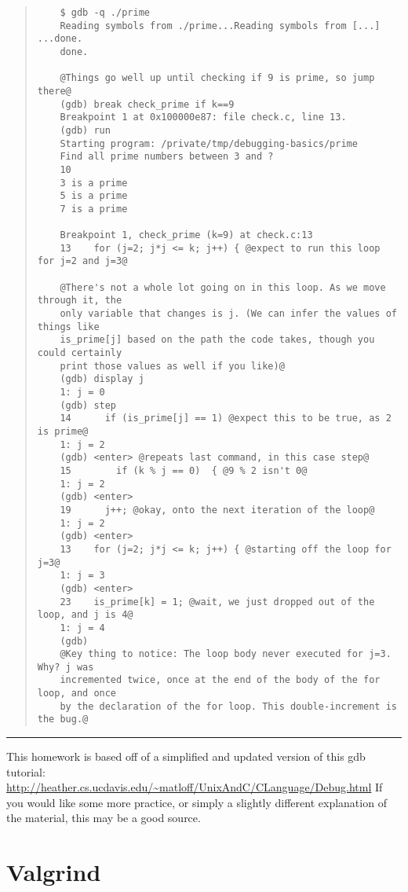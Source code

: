 \documentclass{article}
\begin{document}
\begin{quote}
    \color{violet}
  \begin{lstlisting}
    $ gdb -q ./prime
    Reading symbols from ./prime...Reading symbols from [...] ...done.
    done.

    @Things go well up until checking if 9 is prime, so jump there@
    (gdb) break check_prime if k==9
    Breakpoint 1 at 0x100000e87: file check.c, line 13.
    (gdb) run
    Starting program: /private/tmp/debugging-basics/prime
    Find all prime numbers between 3 and ?
    10
    3 is a prime
    5 is a prime
    7 is a prime

    Breakpoint 1, check_prime (k=9) at check.c:13
    13    for (j=2; j*j <= k; j++) { @expect to run this loop for j=2 and j=3@

    @There's not a whole lot going on in this loop. As we move through it, the
    only variable that changes is j. (We can infer the values of things like
    is_prime[j] based on the path the code takes, though you could certainly
    print those values as well if you like)@
    (gdb) display j
    1: j = 0
    (gdb) step
    14      if (is_prime[j] == 1) @expect this to be true, as 2 is prime@
    1: j = 2
    (gdb) <enter> @repeats last command, in this case step@
    15        if (k % j == 0)  { @9 % 2 isn't 0@
    1: j = 2
    (gdb) <enter>
    19      j++; @okay, onto the next iteration of the loop@
    1: j = 2
    (gdb) <enter>
    13    for (j=2; j*j <= k; j++) { @starting off the loop for j=3@
    1: j = 3
    (gdb) <enter>
    23    is_prime[k] = 1; @wait, we just dropped out of the loop, and j is 4@
    1: j = 4
    (gdb)
    @Key thing to notice: The loop body never executed for j=3. Why? j was
    incremented twice, once at the end of the body of the for loop, and once
    by the declaration of the for loop. This double-increment is the bug.@
  \end{lstlisting}
\end{quote}

\vfill
\hrule
{\footnotesize
This homework is based off of a simplified and updated version of this gdb
tutorial:
\url{http://heather.cs.ucdavis.edu/~matloff/UnixAndC/CLanguage/Debug.html}
If you would like some more practice, or simply a slightly different
explanation of the material, this may be a good source.
}


\newpage
\section{Valgrind}
\end{document}
